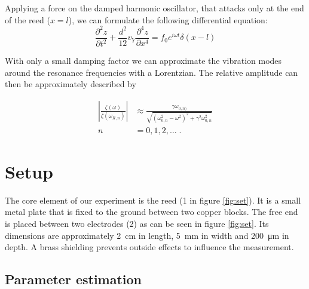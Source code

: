 \documentclass[twoside, a4paper, DIV=11,twocolumn, 12pt]{book}
\begin{document}
Applying a force on the damped harmonic oscillator, that attacks only at the end of the reed ($x = l$), we can formulate the following differential equation:
\begin{equation}
 \frac{\partial^2z}{\partial t^2} + \frac{d^2}{12} v_Y \frac{\partial^4z}{\partial x^4} = f_0 e^{i\omega t}\delta(x - l)
\end{equation}

With only a small damping factor we can approximate the vibration modes around the resonance frequencies with a Lorentzian.
The relative amplitude can then be approximately described by 

\begin{align}
 \left| \frac{\zeta(\omega)}{\zeta(\omega_{R,n})} \right| &\approx \frac{\gamma \omega_{0,n)}}{\sqrt{(\omega_{0,n}^2 - \omega^2)^2 + \gamma^2\omega_{0,n}^2}} \\
 n &= 0, 1, 2,\dots \; \text{.}
\end{align}






\chapter{Setup}
\label{sec:set}


The core element of our experiment is the reed (1 in figure \ref{fig:set}).  It is a small metal plate that is fixed to the ground between two copper blocks.
The free end is placed between two electrodes (2) as can be seen in figure \ref{fig:set}. Its dimensions are approximately 
\SI{2}{\centi\meter} in length, \SI{5}{\milli\meter} in width and \SI{200}{\micro\meter} in depth. A brass shielding prevents outside effects to influence the measurement.



\section{}

\section{Parameter estimation}
\end{document}
